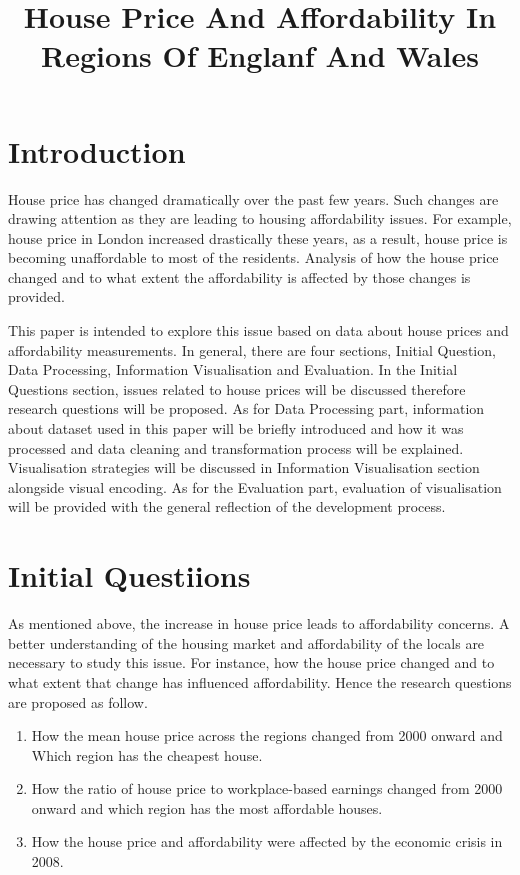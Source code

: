 \documentclass{article}
\title{House Price And Affordability In Regions Of Englanf And Wales}
\begin{document}
%
\maketitle
%

\section{Introduction}
House price has changed dramatically over the past few years. Such changes are drawing attention as they are leading to housing affordability issues. For example, house price in London increased drastically these years, as a result, house price is becoming unaffordable
to most of the residents. Analysis of how the house price changed and to what extent the affordability is affected by those changes is provided.

This paper is intended to explore this issue based on data about house prices and affordability measurements. 
In general, there are four sections, Initial Question, Data Processing, Information Visualisation and Evaluation.
In the Initial Questions section, issues related to house prices will be discussed therefore research questions will be proposed. As for Data Processing part, information about dataset used in this paper will be briefly introduced and how it was processed and data cleaning and transformation process will be explained. 
Visualisation strategies will be discussed in Information Visualisation section alongside visual encoding. 
As for the Evaluation part, evaluation of visualisation will be provided with the general reflection of the development process.

\section{Initial Questiions}
As mentioned above, the increase in house price leads to affordability concerns. A better understanding of the housing market and affordability of the locals are necessary to study this issue. For instance, 
how the house price changed and to what extent that change has influenced affordability. Hence the research questions are proposed as follow.

\begin{enumerate}
  \item How the mean house price across the regions changed from 2000 onward and Which region has the cheapest house.
  \item How the ratio of house price to workplace-based earnings changed from 2000 onward and which region has the most affordable houses.
  \item How the house price and affordability were affected by the economic crisis in 2008.
\end{enumerate}
\end{document}
